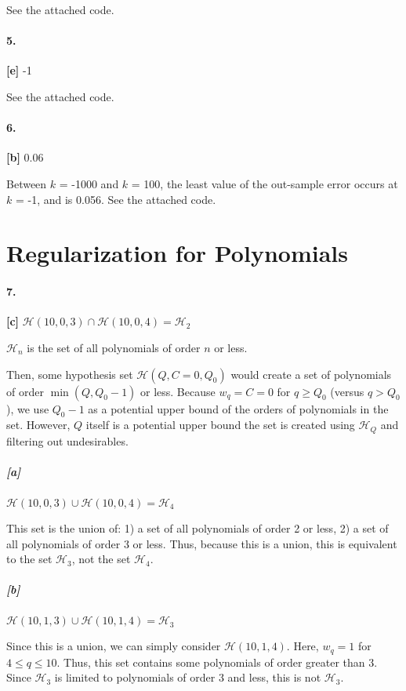 \documentclass[10pt,letter]{article}
\begin{document}
	See the attached code. 

\paragraph{5.} \textbf{[e]} -1

	See the attached code. 

\paragraph{6.} \textbf{[b]} 0.06

	Between $k$ = -1000 and $k$ = 100, the least value of the out-sample error occurs at $k$ = -1, and is 0.056. See the attached code.

\section*{Regularization for Polynomials}

\paragraph{7.} \textbf{[c]} $\mathcal H(10,0,3) \cap \mathcal H(10,0,4) = \mathcal H_2$

	$\mathcal H_n$ is the set of all polynomials of order $n$ or less. 

	Then, some hypothesis set $\mathcal H(Q,C=0,Q_0)$ would create a set of polynomials of order $\min(Q, Q_0-1)$ or less. Because $w_q = C = 0$ for $q \geq Q_0$ (versus $q > Q_0$), we use $Q_0-1$ as a potential upper bound of the orders of polynomials in the set. However, $Q$ itself is a potential upper bound the set is created using $\mathcal H_Q$ and filtering out undesirables. 

\subparagraph{[a]} $\mathcal H(10,0,3) \cup \mathcal H(10,0,4) = \mathcal H_4$

	This set is the union of: 1) a set of all polynomials of order 2 or less, 2) a set of all polynomials of order 3 or less. Thus, because this is a union, this is equivalent to the set $\mathcal H_3$, not the set $\mathcal H_4$.

\subparagraph{[b]} $\mathcal H(10,1,3) \cup \mathcal H(10,1,4) = \mathcal H_3$

	Since this is a union, we can simply consider $\mathcal H(10,1,4)$. Here, $w_q = 1$ for $4 \leq q \leq 10$. Thus, this set contains some polynomials of order greater than 3. Since $\mathcal H_3$ is limited to polynomials of order 3 and less, this is not $\mathcal H_3$.
\end{document}
